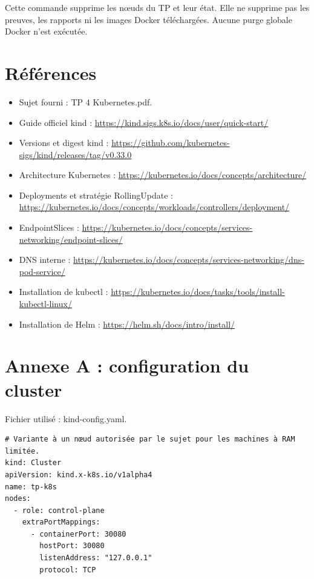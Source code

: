 \documentclass[11pt,a4paper]{article}
\begin{document}
Cette commande supprime les nœuds du TP et leur état. Elle ne supprime pas les preuves, les
rapports ni les images Docker téléchargées. Aucune purge globale Docker n'est exécutée.

\section{Références}

\begin{itemize}
\item Sujet fourni : TP 4 Kubernetes.pdf.
\item Guide officiel kind : \url{https://kind.sigs.k8s.io/docs/user/quick-start/}
\item Versions et digest kind : \url{https://github.com/kubernetes-sigs/kind/releases/tag/v0.33.0}
\item Architecture Kubernetes : \url{https://kubernetes.io/docs/concepts/architecture/}
\item Deployments et stratégie RollingUpdate : \url{https://kubernetes.io/docs/concepts/workloads/controllers/deployment/}
\item EndpointSlices : \url{https://kubernetes.io/docs/concepts/services-networking/endpoint-slices/}
\item DNS interne : \url{https://kubernetes.io/docs/concepts/services-networking/dns-pod-service/}
\item Installation de kubectl : \url{https://kubernetes.io/docs/tasks/tools/install-kubectl-linux/}
\item Installation de Helm : \url{https://helm.sh/docs/intro/install/}
\end{itemize}

\clearpage
\section*{Annexe A : configuration du cluster}

Fichier utilisé : kind-config.yaml.

\par\vspace{4pt}\noindent\begin{minipage}{\linewidth}
\begin{Verbatim}[breaklines=true,breakanywhere=true,fontsize=\footnotesize,frame=single,framesep=8pt,rulecolor=\color{teal}]
# Variante à un nœud autorisée par le sujet pour les machines à RAM limitée.
kind: Cluster
apiVersion: kind.x-k8s.io/v1alpha4
name: tp-k8s
nodes:
  - role: control-plane
    extraPortMappings:
      - containerPort: 30080
        hostPort: 30080
        listenAddress: "127.0.0.1"
        protocol: TCP
\end{Verbatim}
\end{minipage}\par\vspace{6pt}
\end{document}
